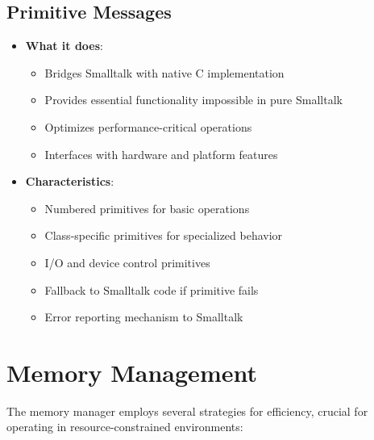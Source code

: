 \documentclass[12pt,a4paper]{report}
\begin{document}
\subsection{Primitive Messages}
\begin{itemize}
    \item \textbf{What it does}:
    \begin{itemize}
        \item Bridges Smalltalk with native C implementation
        \item Provides essential functionality impossible in pure Smalltalk
        \item Optimizes performance-critical operations
        \item Interfaces with hardware and platform features
    \end{itemize}
    
    \item \textbf{Characteristics}:
    \begin{itemize}
        \item Numbered primitives for basic operations
        \item Class-specific primitives for specialized behavior
        \item I/O and device control primitives
        \item Fallback to Smalltalk code if primitive fails
        \item Error reporting mechanism to Smalltalk
    \end{itemize}
\end{itemize}

\section{Memory Management}
The memory manager employs several strategies for efficiency, crucial for operating in resource-constrained environments:
\end{document}
